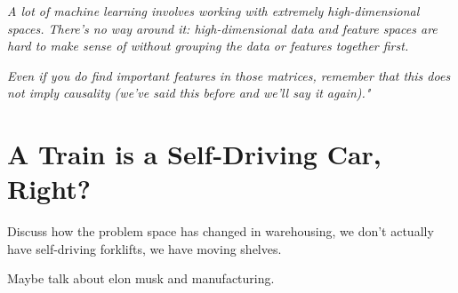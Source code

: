 \textit{A lot of machine learning involves working with extremely high-dimensional spaces. There's no way around it: high-dimensional data and feature spaces are hard to make sense of without grouping the data or features together first.}

\textit{Even if you do find important features in those matrices, remember that this does not imply causality (we've said this before and we'll say it again)."} \cite{trustworthyml}

\section{A Train is a Self-Driving Car, Right?}

Discuss how the problem space has changed in warehousing, we don't actually have self-driving forklifts, we have moving shelves.

Maybe talk about elon musk and manufacturing.
